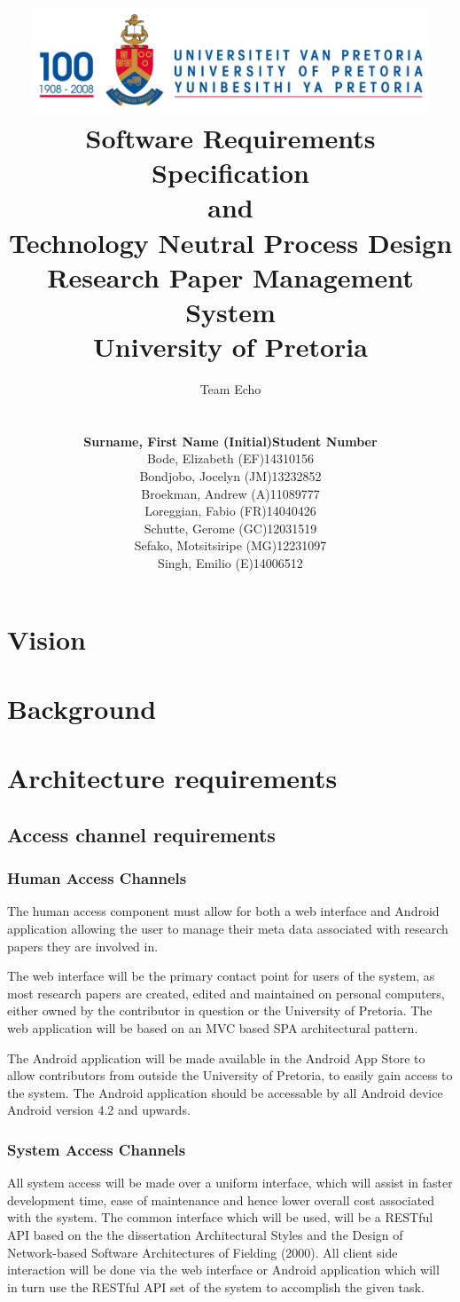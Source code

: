 \documentclass[a4paper,10pt]{article}
\title{\includegraphics[width=12cm]{Eeufeeslogo.jpg} \\
       Software Requirements Specification \\ 
       and \\
       Technology Neutral Process Design \\
       Research Paper Management System \\
       \vspace{0.5cm}
       University of Pretoria \\
       \vspace{1.0cm}
       }
\date{}
\author{Team Echo\\
	\vspace{0.5cm} \\
	\begin{tabu} to \textwidth { X[l] X[l]}
		\hline
		\textbf{Surname, First Name (Initial)}	& \textbf{Student Number}	\\ \hline \hline
		Bode, Elizabeth (EF)			& 14310156		\\ \hline
		Bondjobo, Jocelyn (JM)		& 13232852		\\ \hline
		Broekman, Andrew (A)		& 11089777		\\ \hline
		Loreggian, Fabio (FR)			& 14040426		\\ \hline
		Schutte, Gerome (GC)		& 12031519		\\ \hline
		Sefako, Motsitsiripe (MG)		& 12231097		\\ \hline
		Singh, Emilio (E)			& 14006512		\\ \hline
		\hline
	\end{tabu}}
\begin{document}
\clearpage
\maketitle
\thispagestyle{empty}

\newpage
{}

\tableofcontents

\newpage
{}

\section{Vision}

\section{Background}

\section{Architecture requirements}
\subsection{Access channel requirements}
\subsubsection{Human Access Channels}
The human access component must allow for both a web interface and Android application allowing the user to manage their meta data associated with research papers they are involved in. 

The web interface will be the primary contact point for users of the system, as most research papers are created, edited and maintained on personal computers, either owned by the contributor in question or the University of Pretoria. The web application will be based on an MVC based SPA architectural pattern. 

The Android application will be made available in the Android App Store to allow contributors from outside the University of Pretoria, to easily gain access to the system. The Android application should be accessable by all Android device Android version 4.2 and upwards.

\subsubsection{System Access Channels}
All system access will be made over a uniform interface, which will assist in faster development time, ease of maintenance and hence lower overall cost associated with the system. The common interface which will be used, will be a RESTful API based on the the dissertation Architectural Styles and
the Design of Network-based Software Architectures of Fielding (2000).  All client side interaction will be done via the web interface or Android application which will in turn use the RESTful API set of the system to accomplish the given task.
\end{document}
